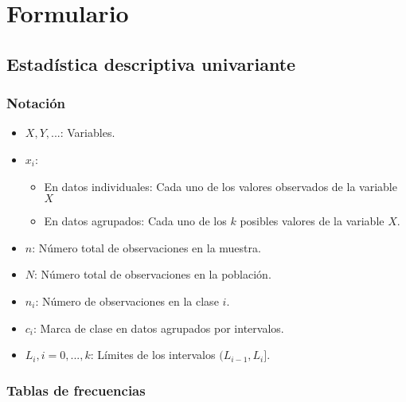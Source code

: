 \documentclass[
]{article}
\providecommand{\tightlist}{%
  \setlength{\itemsep}{0pt}\setlength{\parskip}{0pt}}
\begin{document}
\hypertarget{formulario}{%
\section{Formulario}\label{formulario}}

\hypertarget{estaduxedstica-descriptiva-univariante}{%
\subsection{Estadística descriptiva
univariante}\label{estaduxedstica-descriptiva-univariante}}

\hypertarget{notaciuxf3n}{%
\subsubsection{Notación}\label{notaciuxf3n}}

\begin{itemize}
\item
  \(X, Y, ...\): Variables.
\item
  \(x_i\):

  \begin{itemize}
  \tightlist
  \item
    En datos individuales: Cada uno de los valores observados de la
    variable \(X\)
  \item
    En datos agrupados: Cada uno de los \(k\) posibles valores de la
    variable \(X\).
  \end{itemize}
\item
  \(n\): Número total de observaciones en la muestra.
\item
  \(N\): Número total de observaciones en la población.
\item
  \(n_i\): Número de observaciones en la clase \(i\).
\item
  \(c_i\): Marca de clase en datos agrupados por intervalos.
\item
  \(L_i, i = 0, ..., k\): Límites de los intervalos \((L_{i-1}, L_i]\).
\end{itemize}

\hypertarget{tablas-de-frecuencias}{%
\subsubsection{Tablas de frecuencias}\label{tablas-de-frecuencias}}
\end{document}
